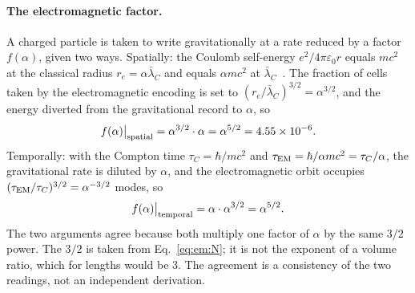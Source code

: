 \paragraph{The electromagnetic factor.} A charged particle is taken to write gravitationally at a rate reduced by a factor $f(\alpha)$, given two
ways. Spatially: the Coulomb self-energy $e^2/4\pi\varepsilon_0r$ equals $mc^2$ at the classical radius $r_e=\alpha\bar\lambda_C$ and equals
$\alpha mc^2$ at $\bar\lambda_C$~\cite{PDG2024}. \observed{} The fraction of cells taken by the electromagnetic encoding is set to
$(r_e/\bar\lambda_C)^{3/2}=\alpha^{3/2}$, and the energy diverted from the gravitational record to $\alpha$, so
\begin{equation}
f(\alpha)\big|_{\rm spatial}=\alpha^{3/2}\cdot\alpha=\alpha^{5/2}=4.55\times10^{-6}.\label{eq:em:fs}
\end{equation}
Temporally: with the Compton time $\tau_C=\hbar/mc^2$ and $\tau_{\rm EM}=\hbar/\alpha mc^2=\tau_C/\alpha$, the gravitational rate is diluted by
$\alpha$, and the electromagnetic orbit occupies $(\tau_{\rm EM}/\tau_C)^{3/2}=\alpha^{-3/2}$ modes, so
\begin{equation}
f(\alpha)\big|_{\rm temporal}=\alpha\cdot\alpha^{3/2}=\alpha^{5/2}.\label{eq:em:ft}
\end{equation}
\conjecture{} The two arguments agree because both multiply one factor of $\alpha$ by the same $3/2$ power. The $3/2$ is taken from
Eq.~\eqref{eq:em:N}; it is not the exponent of a volume ratio, which for lengths would be 3. The agreement is a consistency of the two readings,
not an independent derivation.

